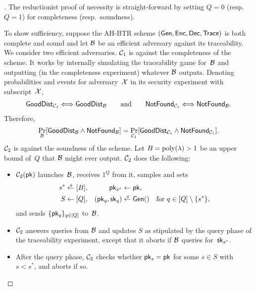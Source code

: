 \begin{proof}[]
The reductionist proof of necessity is straight-forward by setting ${Q=0}$ (resp.~${Q=1}$) for completeness (resp.~soundness).

To show sufficiency, suppose the AH-BTR scheme $(\Gen,\Enc,\Dec,\Trace)$ is both complete and sound and let ${\mathcal{B}}$ be an efficient adversary against its traceability.
We consider two efficient adversaries.
${\mathcal{C}}_1$ is against the completeness of the scheme.
It works by internally simulating the traceability game for~${\mathcal{B}}$ and outputting (in the completeness experiment) whatever ${\mathcal{B}}$ outputs.
Denoting probabilities and events for adversary~${\mathcal{X}}$ in its security experiment with subscript~${\mathcal{X}}$,
\begin{align*}
\GoodDist_{\scriptC_1}
\Longleftrightarrow
\GoodDist_\scriptB
\qquad\textup{and}\qquad
\NotFound_{\scriptC_1}
\Longleftrightarrow
\NotFound_\scriptB.
\end{align*}
Therefore,
\begin{align*}
\Pr_\scriptB[\GoodDist_\scriptB\wedge\NotFound_\scriptB]
=
\Pr_{\scriptC_1}
[\GoodDist_{\scriptC_1}\wedge\NotFound_{\scriptC_1}].
\end{align*}
${\mathcal{C}}_2$ is against the soundness of the scheme.
Let ${B=\operatorname{poly}(\lambda)>1}$ be an upper bound of~$Q$ that ${\mathcal{B}}$ might ever output.
${\mathcal{C}}_2$ does the following:
\begin{itemize}
\item $\scriptC_2(\pk)$ launches~${\mathcal{B}}$, receives $1^Q$ from it,
samples and sets
\begin{align*}
s^\ast&{}\draws[B],&
\pk_{s^\ast}&{}\gets\pk,\\
S&{}\gets[Q],&
(\pk_q,\sk_q)&{}\draws\Gen()\quad\textup{for }q\in{[Q]\setminus{\{s^\ast\}}},
\end{align*}
and sends $\{\pk_q\}_{q\in[Q]}$ to~${\mathcal{B}}$.
\item ${\mathcal{C}}_2$ answers queries from ${\mathcal{B}}$ and updates $S$ as stipulated by the query phase of the traceability experiment, except that it aborts if ${\mathcal{B}}$ queries for~$\sk_{s^\ast}$.
\item After the query phase,
${\mathcal{C}}_2$ checks whether ${\pk_s=\pk}$ for some ${s\in S}$ with ${s<s^\ast}$,
and aborts if so.

\end{itemize}
\end{proof}
